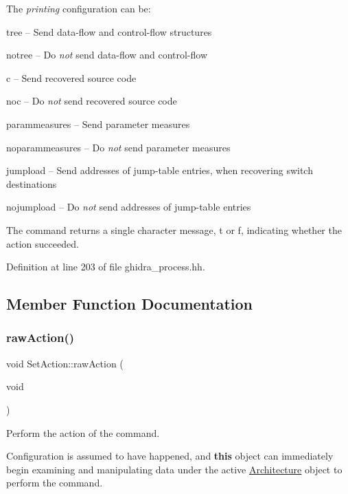 The {\itshape printing} configuration can be\+:
\begin{DoxyItemize}
\item tree -- Send data-\/flow and control-\/flow structures
\item notree -- Do {\itshape not} send data-\/flow and control-\/flow
\item c -- Send recovered source code
\item noc -- Do {\itshape not} send recovered source code
\item parammeasures -- Send parameter measures
\item noparammeasures -- Do {\itshape not} send parameter measures
\item jumpload -- Send addresses of jump-\/table entries, when recovering switch destinations
\item nojumpload -- Do {\itshape not} send addresses of jump-\/table entries
\end{DoxyItemize}

The command returns a single character message, \textquotesingle{}t\textquotesingle{} or \textquotesingle{}f\textquotesingle{}, indicating whether the action succeeded. 

Definition at line 203 of file ghidra\+\_\+process.\+hh.



\subsection{Member Function Documentation}
\mbox{\label{class_set_action_af53890c4472a36b4c78d0c97bb1f39d4}} 
\subsubsection{\texorpdfstring{rawAction()}{rawAction()}}
{\footnotesize\ttfamily void Set\+Action\+::raw\+Action (\begin{DoxyParamCaption}\item[{void}]{ }\end{DoxyParamCaption})\hspace{0.3cm}{\ttfamily [virtual]}}



Perform the action of the command. 

Configuration is assumed to have happened, and {\bfseries{this}} object can immediately begin examining and manipulating data under the active \mbox{\hyperlink{class_architecture}{Architecture}} object to perform the command. 

